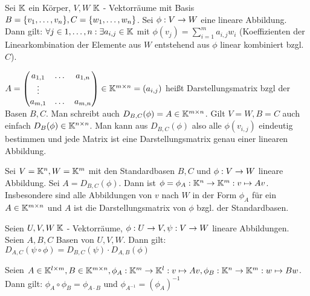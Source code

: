 \begin{definition}[Darstellungsmatrix]
	Sei $\mathbb{K}$ ein Körper, $V,W$ $\mathbb{K}$ - Vektorräume mit Basis $B = \{v_1, \dots, v_n\}, C = \{w_1, \dots, w_n\}$. Sei $\phi : V \rightarrow W$ eine lineare Abbildung.
	Dann gilt: $\forall j \in 1, \dots , n: \exists a_{i,j} \in \mathbb{K}$ mit $\phi(v_j) = \sum_{i=1}^{m} a_{i,j} w_i$ (Koeffizienten der Linearkombination der Elemente aus $W$ entstehend aus $\phi$ linear kombiniert bzgl. $C$). 

	$A = \begin{pmatrix}
		a_{1,1} & \dots & a_{1,n} \\
		\vdots & & \\
		a_{m,1} & \dots & a_{m,n}
	\end{pmatrix} \in \mathbb{K}^{m \times n} = (a_{i,j})$ heißt Darstellungsmatrix bzgl der Basen $B, C$. Man schreibt auch $D_{B,C}(\phi) = A \in \mathbb{K}^{m \times n}$. Gilt $V=W, B=C$ auch einfach $D_B(\phi) \in \mathbb{K}^{n \times n}$. Man kann aus $D_{B,C}(\phi)$ also alle $\phi(v_{i,j})$ eindeutig bestimmen und jede Matrix ist eine Darstellungsmatrix genau einer linearen Abbildung.
\end{definition}

\begin{definition}
	Sei $V = \mathbb{K}^n, W=\mathbb{K}^m$ mit den Standardbasen $B,C$ und $\phi : V \rightarrow W$ lineare Abbildung. Sei $A=D_{B,C}(\phi)$. Dann ist $\phi = \phi_A : \mathbb{K}^n \rightarrow \mathbb{K}^m : v \mapsto Av$. Insbesondere sind alle Abbildungen von $v$ nach $W$ in der Form $\phi_A$ für ein $A \in \mathbb{K}^{m \times n}$ und $A$ ist die Darstellungsmatrix von $\phi$ bzgl. der Standardbasen.
\end{definition}

\begin{satz}
	Seien $U,V,W \medspace \mathbb{K}$ - Vektorräume, $\phi : U \rightarrow V, \psi : V \rightarrow W$ lineare Abbildungen. Seien $A,B,C$ Basen von $U,V,W$. Dann gilt: $D_{A,C}(\psi \circ \phi) = D_{B,C}(\psi) \cdot D_{A,B}(\phi)$
\end{satz}

\begin{satz}
	Seien $A \in \mathbb{K}^{l \times m}, B \in \mathbb{K}^{m \times n}, \phi_A : \mathbb{K}^m \rightarrow \mathbb{K}^l : v \mapsto Av, \phi_B : \mathbb{K}^n \rightarrow \mathbb{K}^m : w \mapsto Bw$. Dann gilt:  $\phi_A \circ \phi_B = \phi_{A \cdot B}$ und 
	 $\phi_{A^{-1}} = (\phi_A)^{-1}$
\end{satz}


